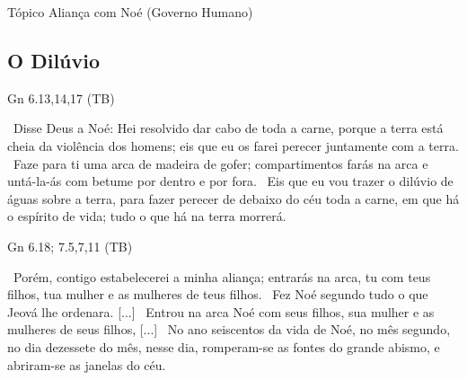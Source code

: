 \documentclass[12pt,aspectratio=169]{beamer}
\newcommand{\ver}[1]{%
    \raisebox{0.50ex}{%
        \scalebox{1.1}{%
            \pmb{\textbf{\textcolor{BSpbg}{#1}}}%
        }%
    }%
}
\newcommand{\QUOTE}[1]{%
    \par\noindent\hspace*{0.05\linewidth}%
    \begin{minipage}{0.9\linewidth}%
        \linespread{1.35}\large{#1}%
    \end{minipage}%
}
\newcommand{\RED}[1]{{\textcolor{TXred}{#1}}}
\newcommand{\YEL}[1]{{\textcolor{TXyel}{#1}}}
\newcommand{\GRE}[1]{{\textcolor{TXgre}{#1}}}
\begin{document}
    \begin{frame}
        \par\noindent\hspace*{0.05\linewidth}%
        \begin{minipage}{0.9\linewidth}%
            \large%
            \begin{alertblock}{Tópico}
                Aliança com Noé (Governo Humano)
            \end{alertblock}
        \end{minipage}%
    \end{frame}

    \subsection{O Dilúvio}

    \begin{frame}{Gn 6.13,14,17 (TB)}
        \QUOTE{%
            \ver{13}~Disse Deus a Noé: Hei resolvido dar cabo de toda a carne, porque a terra
            está cheia da \RED{violência dos homens}; eis que eu os farei perecer juntamente com
            a terra.
            \ver{14}~Faze para ti uma \GRE{arca} de madeira de gofer; compartimentos farás na
            arca e untá-la-ás com betume por dentro e por fora.
            \ver{17}~Eis que eu vou trazer o \YEL{dilúvio} de águas sobre a terra, para fazer
            perecer de debaixo do céu toda a carne, em que há o espírito de vida; \RED{tudo} o
            que há na terra \RED{morrerá}.
        }
    \end{frame}

    \begin{frame}{Gn 6.18; 7.5,7,11 (TB)}
        \QUOTE{%
            \ver{6.18}~Porém, \YEL{contigo estabelecerei a minha aliança}; entrarás na arca,
            \GRE{tu} com \GRE{teus filhos}, \GRE{tua mulher} e as \GRE{mulheres de teus filhos}.
            \ver{7.5}~Fez Noé segundo tudo o que Jeová lhe ordenara. [...]
            \ver{7.7}~Entrou na arca Noé com seus filhos, sua mulher e as mulheres de seus
            filhos, [...]
            \ver{7.11}~No \YEL{ano} seiscentos da vida de Noé, no \YEL{mês} segundo, no
            \YEL{dia} dezessete do mês, \YEL{nesse dia}, romperam-se as fontes do grande abismo,
            e abriram-se as janelas do céu.
        }
    \end{frame}
\end{document}
